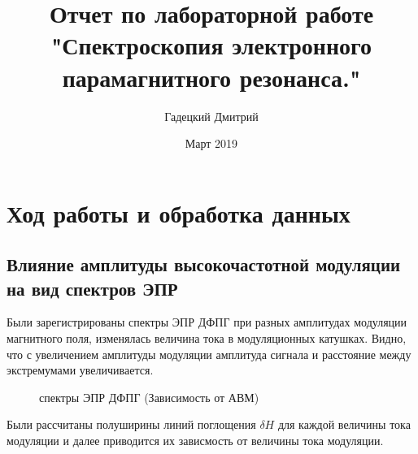 \documentclass[a4paper,12pt]{article}
\title{Отчет по лабораторной работе "Спектроскопия электронного парамагнитного резонанса."}
\author{Гадецкий Дмитрий}
\date{Март 2019}
\theoremstyle{plain} %
\theoremstyle{definition} %
\theoremstyle{remark} %
\begin{document}
\maketitle
\thispagestyle{empty}
\newpage	 
\setcounter{page}{10}
\section{Ход работы и обработка данных}
\subsection{Влияние амплитуды высокочастотной модуляции на вид спектров ЭПР}

Были зарегистрированы спектры ЭПР ДФПГ при разных амплитудах
модуляции магнитного поля, изменялась величина тока в модуляционных
катушках.
Видно, что с увеличением амплитуды модуляции
амплитуда сигнала и расстояние между экстремумами увеличивается.

\begin{figure}[h!]
	\caption{спектры ЭПР ДФПГ (Зависимость от АВМ)}
	\label{fig:image}
\end{figure}

Были рассчитаны полуширины линий поглощения $\delta H$ для каждой величины
тока модуляции и далее приводится их зависмость от величины тока модуляции.
\end{document}
